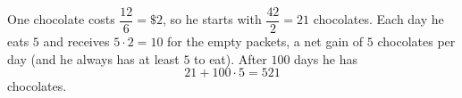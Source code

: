 One chocolate costs $\dfrac{12}{6}=\$2$, so he starts with $\dfrac{42}{2}=21$ chocolates. Each day he eats $5$ and receives $5\cdot2=10$ for the empty packets, a net gain of $5$ chocolates per day (and he always has at least $5$ to eat). After $100$ days he has
\[
21+100\cdot5=\boxed{521}
\]
chocolates.
